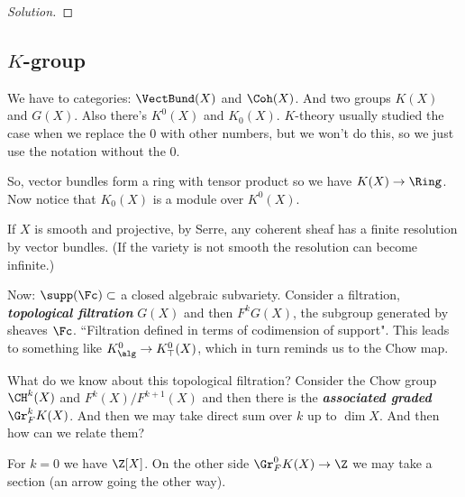 \begin{proof}[Solution]
	
\end{proof}

\subsection{$K$-group}
We have to categories: $\VectBund(X)$ and $\Coh(X)$. And two groups $K(X)$ and $G(X)$. Also there's $K^0(X)$ and $K_0(X)$. $K$-theory usually studied the case when we replace the $0$ with other numbers, but we won't do this, so we just use the notation without the $0$.

So, vector bundles form a ring with tensor product so we have $K(X)\to \Ring$. Now notice that $K_0(X)$ is a module over $K^0(X)$.

If $X$ is smooth and projective, by Serre, any coherent sheaf has a finite resolution by vector bundles. (If the variety is not smooth the resolution can become infinite.)

Now: $\supp(\Fc)\subset$ a closed algebraic subvariety. Consider a filtration, \textbf{\textit{topological filtration}} $G(X)$ and then $F^kG(X)$, the subgroup generated by sheaves $\Fc$. ``Filtration defined in terms of codimension of support". This leads to something like $K^0_{\alg}\to K^0_{\top}(X)$, which in turn reminds us to the Chow map.

What do we know about this topological filtration? Consider the Chow group $\CH^k(X)$ and $F^k(X)/F^{k+1}(X)$ and then there is the \textbf{\textit{associated graded}} $\Gr^k_FK(X)$. And then we may take direct sum over $k$ up to $\dim X$. And then how can we relate them?

For $k=0$ we have $\Z[X]$. On the other side $\Gr^0_FK(X)\to \Z$ we may take a section (an arrow going the other way).

